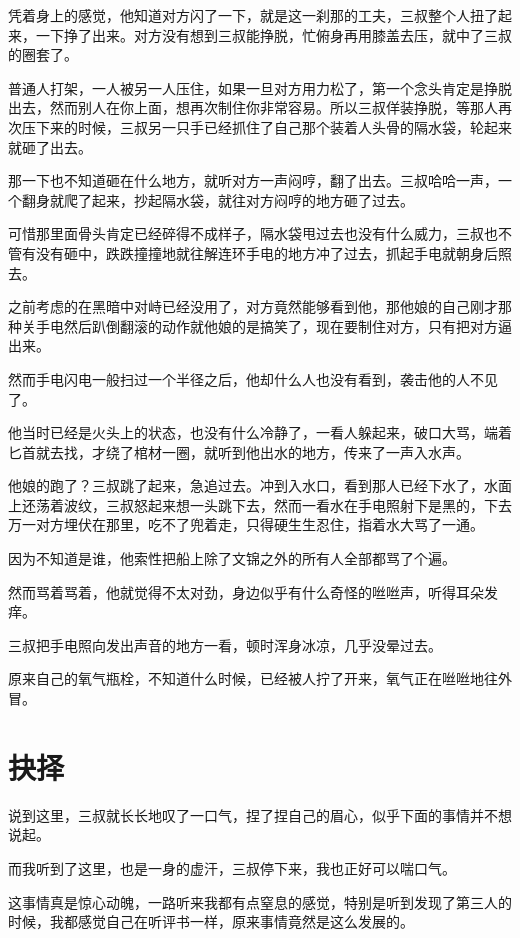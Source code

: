 凭着身上的感觉，他知道对方闪了一下，就是这一刹那的工夫，三叔整个人扭了起来，一下挣了出来。对方没有想到三叔能挣脱，忙俯身再用膝盖去压，就中了三叔的圈套了。

普通人打架，一人被另一人压住，如果一旦对方用力松了，第一个念头肯定是挣脱出去，然而别人在你上面，想再次制住你非常容易。所以三叔佯装挣脱，等那人再次压下来的时候，三叔另一只手已经抓住了自己那个装着人头骨的隔水袋，轮起来就砸了出去。

那一下也不知道砸在什么地方，就听对方一声闷哼，翻了出去。三叔哈哈一声，一个翻身就爬了起来，抄起隔水袋，就往对方闷哼的地方砸了过去。

可惜那里面骨头肯定已经碎得不成样子，隔水袋甩过去也没有什么威力，三叔也不管有没有砸中，跌跌撞撞地就往解连环手电的地方冲了过去，抓起手电就朝身后照去。

之前考虑的在黑暗中对峙已经没用了，对方竟然能够看到他，那他娘的自己刚才那种关手电然后趴倒翻滚的动作就他娘的是搞笑了，现在要制住对方，只有把对方逼出来。

然而手电闪电一般扫过一个半径之后，他却什么人也没有看到，袭击他的人不见了。

他当时已经是火头上的状态，也没有什么冷静了，一看人躲起来，破口大骂，端着匕首就去找，才绕了棺材一圈，就听到他出水的地方，传来了一声入水声。

他娘的跑了？三叔跳了起来，急追过去。冲到入水口，看到那人已经下水了，水面上还荡着波纹，三叔怒起来想一头跳下去，然而一看水在手电照射下是黑的，下去万一对方埋伏在那里，吃不了兜着走，只得硬生生忍住，指着水大骂了一通。

因为不知道是谁，他索性把船上除了文锦之外的所有人全部都骂了个遍。

然而骂着骂着，他就觉得不太对劲，身边似乎有什么奇怪的咝咝声，听得耳朵发痒。

三叔把手电照向发出声音的地方一看，顿时浑身冰凉，几乎没晕过去。

原来自己的氧气瓶栓，不知道什么时候，已经被人拧了开来，氧气正在咝咝地往外冒。

\chapter{抉择}

说到这里，三叔就长长地叹了一口气，捏了捏自己的眉心，似乎下面的事情并不想说起。

而我听到了这里，也是一身的虚汗，三叔停下来，我也正好可以喘口气。

这事情真是惊心动魄，一路听来我都有点窒息的感觉，特别是听到发现了第三人的时候，我都感觉自己在听评书一样，原来事情竟然是这么发展的。

